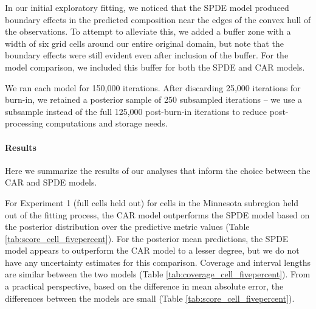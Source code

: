 \documentclass[10pt,letterpaper]{article}
\begin{document}
In our initial exploratory fitting, we noticed that the SPDE model
produced boundary effects in the predicted composition near the edges
of the convex hull of the observations. To attempt to alleviate this,
we added a buffer zone with a width of six grid cells around our entire
original domain, but note that the boundary effects were still evident
even after inclusion of the buffer. For the model comparison, we included
this buffer for both the SPDE and CAR models. 

We ran each model for 150,000 iterations. After discarding 25,000
iterations for burn-in, we retained a posterior sample of 250 subsampled
iterations -- we use a subsample instead of the full 125,000 post-burn-in
iterations to reduce post-processing computations and storage needs. 



\paragraph*{Results}

Here we summarize the results of our analyses that inform the choice
between the CAR and SPDE models. 

For Experiment 1 (full cells held out) for cells in the Minnesota
subregion held out of the fitting process, the CAR model outperforms
the SPDE model based on the posterior distribution over the predictive
metric values (Table \ref{tab:score_cell_fivepercent}). For the posterior
mean predictions, the SPDE model appears to outperform the CAR model
to a lesser degree, but we do not have any uncertainty estimates for
this comparison. Coverage and interval lengths are similar between
the two models (Table \ref{tab:coverage_cell_fivepercent}). From
a practical perspective, based on the difference in mean absolute
error, the differences between the models are small (Table \ref{tab:score_cell_fivepercent}).
\end{document}
